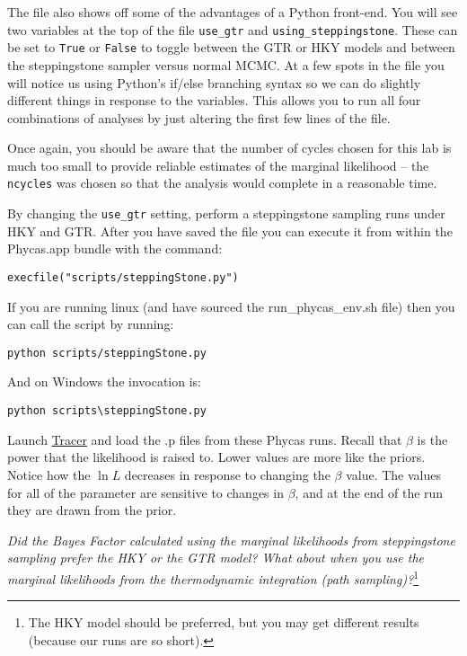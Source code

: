 \documentclass{article}
\newcommand{\cmdopt}[1]{\texttt{#1}\xspace}
\newcommand{\localfile}[1]{\textsf{#1}\xspace}
\newcommand{\QandA}[2]{\textit{#1}\footnote{#2}\xspace}
\begin{document}
The file also shows off some of the advantages of a Python front-end.  
You will see two variables at the top of the file \cmdopt{use\_gtr} and \cmdopt{using\_steppingstone}.
These can be set to \cmdopt{True} or \cmdopt{False} to toggle between the GTR or HKY models and between the steppingstone sampler versus normal MCMC.
At a few spots in the file you will notice us using Python's if/else branching syntax so we can do slightly different things
in response to the variables.
This allows you to run all four combinations of analyses by just altering the first few lines of the file.

Once again, you should be aware that the number of cycles chosen for this lab is much too small to provide reliable estimates of the marginal likelihood -- the \cmdopt{ncycles} was chosen so that the analysis would complete in a reasonable time.

By changing the \cmdopt{use\_gtr} setting, perform a steppingstone sampling runs under HKY and GTR. 
After you have saved the file you can execute it from within the Phycas.app bundle with the command:
\begin{verbatim}
execfile("scripts/steppingStone.py")
\end{verbatim} 
If you are running linux (and have sourced the \localfile{run\_phycas\_env.sh} file) then you can call the script by running:
\begin{verbatim}
python scripts/steppingStone.py
\end{verbatim} 
And on Windows the invocation is:
\begin{verbatim}
python scripts\steppingStone.py
\end{verbatim} 

Launch \href{http://beast.bio.ed.ac.uk/}{Tracer} and load the \localfile{.p} files from these Phycas runs.
Recall that  $\beta$ is the power that the likelihood is raised to.
Lower values are more like the priors.
Notice how the $\ln L$ decreases in response to changing the $\beta$ value.
The values for all of the parameter  are sensitive to changes in $\beta$, and at the end of the run they are drawn from the prior.



\QandA{Did the Bayes Factor calculated using the marginal likelihoods from steppingstone sampling prefer the HKY or the GTR model? What about when you use the marginal likelihoods from the thermodynamic integration (path sampling)?}{The HKY model should be preferred, but 
you may get different results (because our runs are so short).}
\end{document}
